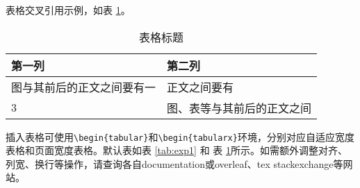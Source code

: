 表格交叉引用示例，如表 \ref{tab:exp2}。

\begin{table}[!h]
    \centering
    \caption{表格标题}
    \label{tab:exp2}
    \tabfont %
    \begin{tabularx}{\textwidth}{XX}
        \toprule
        第一列                     & 第二列                     \\
        \midrule
        图与其前后的正文之间要有一 & 正文之间要有               \\
        3                          & 图、表等与其前后的正文之间 \\
        \bottomrule
    \end{tabularx}
\end{table}

插入表格可使用\verb|\begin{tabular}|和\verb|\begin{tabularx}|环境，分别对应自适应宽度表格和页面宽度表格。默认表如表 \ref{tab:exp1} 和 表 \ref{tab:exp2}所示。如需额外调整对齐、列宽、换行等操作，请查询各自documentation或overleaf、tex stackexchange等网站。